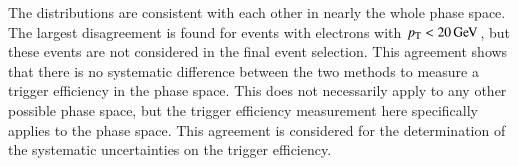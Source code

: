 The distributions are consistent with each other in nearly the whole phase space. The largest disagreement is found for events with electrons with $p_{\mathrm{T}}<20\,\text{Ge\hspace{-.08em}V}$, but these events are not considered in the final event selection. This agreement shows that there is no systematic difference between the two methods to measure a trigger efficiency in the \ttbar phase space. This does not necessarily apply to any other possible phase space, but the trigger efficiency measurement here specifically applies to the \ttbar phase space. This agreement is considered for the determination of the systematic uncertainties on the trigger efficiency.

\begin{figure}[htbp!]
  \begin{center}
    \\

\end{center}
\end{figure}
